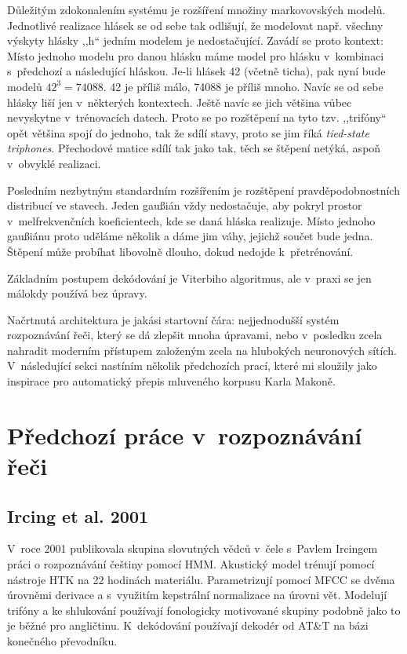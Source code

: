Důležitým zdokonalením systému je rozšíření množiny markovovských modelů.
Jednotlivé realizace hlásek se od sebe tak odlišují, že modelovat např. všechny
výskyty hlásky ,,h`` jedním modelem je nedostačující. Zavádí se proto kontext:
Místo jednoho modelu pro danou hlásku máme model pro hlásku v~kombinaci
s~předchozí a následující hláskou. Je-li hlásek 42 (včetně ticha), pak nyní
bude modelů $42^3 = 74088$. 42 je příliš málo, 74088 je příliš mnoho. Navíc se
od sebe hlásky liší jen v~některých kontextech. Ještě navíc se jich většina
vůbec nevyskytne v~trénovacích datech. Proto se po rozštěpení na tyto tzv.
,,trifóny`` opět většina spojí do jednoho, tak že sdílí stavy, proto se jim říká
\textit{tied-state triphones}. Přechodové matice sdílí tak jako tak, těch se
štěpení netýká, aspoň v~obvyklé realizaci.

Posledním nezbytným standardním rozšířením je rozštěpení pravděpodobnostních
distribucí ve stavech. Jeden gaußián vždy nedostačuje, aby pokryl prostor
v~melfrekvenčních koeficientech, kde se daná hláska realizuje. Místo jednoho
gaußiánu proto uděláme několik a dáme jim váhy, jejichž součet bude jedna.
Štěpení může probíhat libovolně dlouho, dokud nedojde k~přetrénování.

Základním postupem dekódování je Viterbiho algoritmus, ale v~praxi se jen
málokdy používá bez úpravy.

Načrtnutá architektura je jakási startovní čára: nejjednodušší systém
rozpoznávání řeči, který se dá zlepšit mnoha úpravami, nebo v~posledku zcela
nahradit moderním přístupem založeným zcela na hlubokých neuronových sítích.
V~následující sekci nastíním několik předchozích prací, které mi sloužily jako
inspirace pro automatický přepis mluveného korpusu Karla Makoně.

\section{Předchozí práce v~rozpoznávání řeči}

\subsection{Ircing et al. 2001}

V~roce 2001 publikovala skupina slovutných vědců v~čele s~Pavlem Ircingem práci
o rozpoznávání češtiny pomocí HMM\cite{ircing2001large}. Akustický model trénují
pomocí nástroje HTK na 22 hodinách materiálu. Parametrizují pomocí MFCC se dvěma
úrovněmi derivace a s~využitím kepstrální normalizace na úrovni vět. Modelují
trifóny a ke shlukování používají fonologicky motivované skupiny podobně jako to
je běžné pro angličtinu. K~dekódování používají dekodér od AT\&T na bázi
konečného převodníku\cite{mohri2002weighted}.

